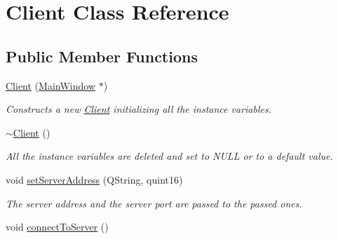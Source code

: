 \hypertarget{classClient}{
\section{Client Class Reference}
\label{classClient}
}
\subsection*{Public Member Functions}
\begin{DoxyCompactItemize}
\item 
\hypertarget{classClient_ac7de52639b0eafbd02795fb3e1f28825}{
\hyperlink{classClient_ac7de52639b0eafbd02795fb3e1f28825}{Client} (\hyperlink{classMainWindow}{MainWindow} $\ast$)}
\label{classClient_ac7de52639b0eafbd02795fb3e1f28825}

\begin{DoxyCompactList}\small\item\em Constructs a new \hyperlink{classClient}{Client} initializing all the instance variables. \item\end{DoxyCompactList}\item 
\hypertarget{classClient_a840e519ca781888cbd54181572ebe3a7}{
\hyperlink{classClient_a840e519ca781888cbd54181572ebe3a7}{$\sim$Client} ()}
\label{classClient_a840e519ca781888cbd54181572ebe3a7}

\begin{DoxyCompactList}\small\item\em All the instance variables are deleted and set to NULL or to a default value. \item\end{DoxyCompactList}\item 
\hypertarget{classClient_a666800aa97272c4d07fd713526843c05}{
void \hyperlink{classClient_a666800aa97272c4d07fd713526843c05}{setServerAddress} (QString, quint16)}
\label{classClient_a666800aa97272c4d07fd713526843c05}

\begin{DoxyCompactList}\small\item\em The server address and the server port are passed to the passed ones. \item\end{DoxyCompactList}\item 
\hypertarget{classClient_a484b660517d6a610b6733bee7e96cb8c}{
void \hyperlink{classClient_a484b660517d6a610b6733bee7e96cb8c}{connectToServer} ()}
\label{classClient_a484b660517d6a610b6733bee7e96cb8c}


\end{DoxyCompactItemize}
